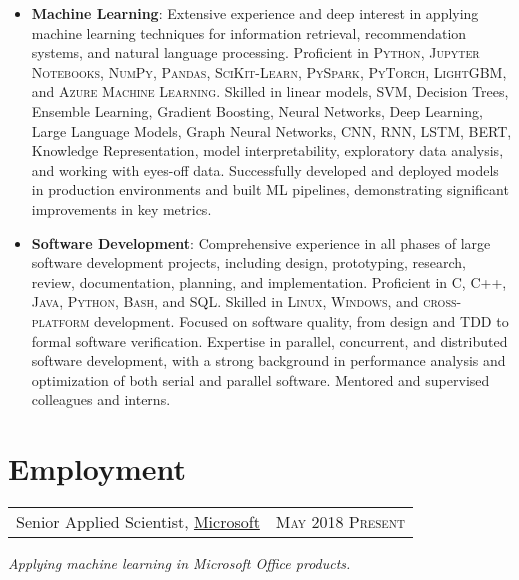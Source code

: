 \documentclass{article}
\makeatletter
\newcommand{\whatwherewhen}[3]{
\noindent\begin{tabular*}{\columnwidth}{@{}@{\extracolsep{\fill}}lr@{}}
#1, #2 & \textsc{#3}
\end{tabular*}}
\makeatother
\begin{document}
\begin{itemize}

\item \textbf{Machine Learning}: Extensive experience and deep interest in applying machine learning techniques for information retrieval, recommendation systems, and natural language processing. Proficient in \textsc{Python}, \textsc{Jupyter Notebooks}, \textsc{NumPy}, \textsc{Pandas}, \textsc{SciKit-Learn}, \textsc{PySpark}, \textsc{PyTorch}, \textsc{LightGBM}, and \textsc{Azure Machine Learning}. Skilled in linear models, SVM, Decision Trees, Ensemble Learning, Gradient Boosting, Neural Networks, Deep Learning, Large Language Models, Graph Neural Networks, CNN, RNN, LSTM, BERT, Knowledge Representation, model interpretability, exploratory data analysis, and working with eyes-off data. Successfully developed and deployed models in production environments and built ML pipelines, demonstrating significant improvements in key metrics.

\item \textbf{Software Development}: Comprehensive experience in all phases of large software development projects, including design, prototyping, research, review, documentation, planning, and implementation. Proficient in \textsc{C}, \textsc{C++}, \textsc{Java}, \textsc{Python}, \textsc{Bash}, and \textsc{SQL}. Skilled in \textsc{Linux}, \textsc{Windows}, and \textsc{cross-platform} development. Focused on software quality, from design and TDD to formal software verification. Expertise in parallel, concurrent, and distributed software development, with a strong background in performance analysis and optimization of both serial and parallel software. Mentored and supervised colleagues and interns.

\end{itemize}


\section{Employment}

\whatwherewhen{Senior Applied Scientist}{\href{https://www.microsoft.com/}{Microsoft}}{May 2018 \textendash{} Present}

\textit{Applying machine learning in Microsoft Office products.}
\end{document}
